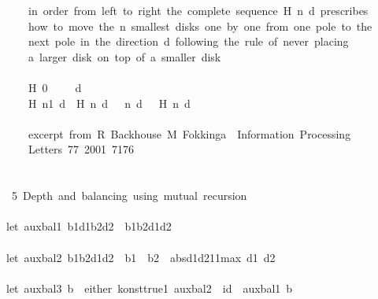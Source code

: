 \documentclass[a4paper]{article}
\begin{document}
\begin{tabbing}
\ttfamily ~~~~~in~order~from~left~to~right~the~complete~sequence~H~n~d~prescribes\\
\ttfamily ~~~~~how~to~move~the~n~smallest~disks~one~by~one~from~one~pole~to~the\\
\ttfamily ~~~~~next~pole~in~the~direction~d~following~the~rule~of~never~placing\\
\ttfamily ~~~~~a~larger~disk~on~top~of~a~smaller~disk\\
\ttfamily ~~~~~\\
\ttfamily ~~~~~H~0~~~~~d~~\\
\ttfamily ~~~~~H~n1~d~~H~n~d~~~n~d~~~H~n~d\\
\ttfamily ~~~~~\\
\ttfamily ~~~~~excerpt~from~R~Backhouse~M~Fokkinga~~Information~Processing\\
\ttfamily ~~~~~Letters~77~2001~7176\\
\ttfamily ~\\
\ttfamily ~\\
\ttfamily ~~5~Depth~and~balancing~using~mutual~recursion~\\
\ttfamily ~\\
\ttfamily ~let~auxbal1~b1d1b2d2~~b1b2d1d2\\
\ttfamily ~\\
\ttfamily ~let~auxbal2~b1b2d1d2~~b1~~b2~~absd1d211max~d1~d2\\
\ttfamily ~\\
\ttfamily ~let~auxbal3~b~~either~konsttrue1~auxbal2~~id~~auxbal1~b\\

\end{tabbing}
\end{document}
